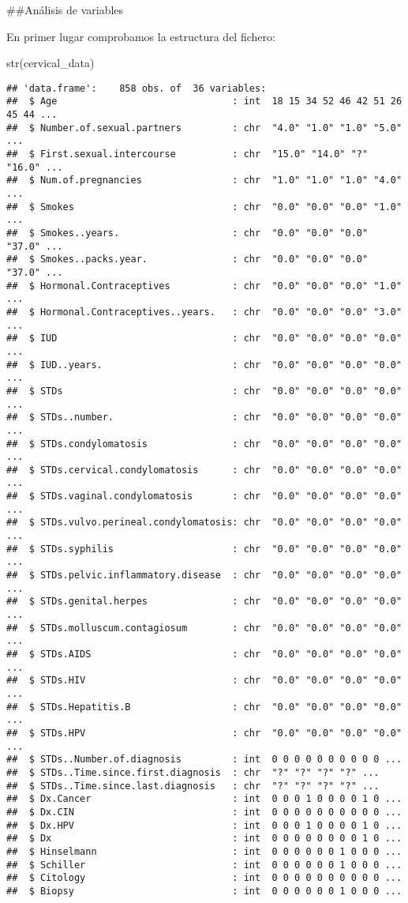 \documentclass[
]{article}
\newenvironment{Shaded}{\begin{snugshade}}{\end{snugshade}}
\newcommand{\FunctionTok}[1]{\textcolor[rgb]{0.94,0.94,0.56}{#1}}
\newcommand{\NormalTok}[1]{\textcolor[rgb]{0.80,0.80,0.80}{#1}}
\begin{document}
\#\#Análisis de variables

En primer lugar comprobamos la estructura del fichero:

\begin{Shaded}
\begin{Highlighting}[]
\FunctionTok{str}\NormalTok{(cervical\_data)}
\end{Highlighting}
\end{Shaded}

\begin{verbatim}
## 'data.frame':    858 obs. of  36 variables:
##  $ Age                               : int  18 15 34 52 46 42 51 26 45 44 ...
##  $ Number.of.sexual.partners         : chr  "4.0" "1.0" "1.0" "5.0" ...
##  $ First.sexual.intercourse          : chr  "15.0" "14.0" "?" "16.0" ...
##  $ Num.of.pregnancies                : chr  "1.0" "1.0" "1.0" "4.0" ...
##  $ Smokes                            : chr  "0.0" "0.0" "0.0" "1.0" ...
##  $ Smokes..years.                    : chr  "0.0" "0.0" "0.0" "37.0" ...
##  $ Smokes..packs.year.               : chr  "0.0" "0.0" "0.0" "37.0" ...
##  $ Hormonal.Contraceptives           : chr  "0.0" "0.0" "0.0" "1.0" ...
##  $ Hormonal.Contraceptives..years.   : chr  "0.0" "0.0" "0.0" "3.0" ...
##  $ IUD                               : chr  "0.0" "0.0" "0.0" "0.0" ...
##  $ IUD..years.                       : chr  "0.0" "0.0" "0.0" "0.0" ...
##  $ STDs                              : chr  "0.0" "0.0" "0.0" "0.0" ...
##  $ STDs..number.                     : chr  "0.0" "0.0" "0.0" "0.0" ...
##  $ STDs.condylomatosis               : chr  "0.0" "0.0" "0.0" "0.0" ...
##  $ STDs.cervical.condylomatosis      : chr  "0.0" "0.0" "0.0" "0.0" ...
##  $ STDs.vaginal.condylomatosis       : chr  "0.0" "0.0" "0.0" "0.0" ...
##  $ STDs.vulvo.perineal.condylomatosis: chr  "0.0" "0.0" "0.0" "0.0" ...
##  $ STDs.syphilis                     : chr  "0.0" "0.0" "0.0" "0.0" ...
##  $ STDs.pelvic.inflammatory.disease  : chr  "0.0" "0.0" "0.0" "0.0" ...
##  $ STDs.genital.herpes               : chr  "0.0" "0.0" "0.0" "0.0" ...
##  $ STDs.molluscum.contagiosum        : chr  "0.0" "0.0" "0.0" "0.0" ...
##  $ STDs.AIDS                         : chr  "0.0" "0.0" "0.0" "0.0" ...
##  $ STDs.HIV                          : chr  "0.0" "0.0" "0.0" "0.0" ...
##  $ STDs.Hepatitis.B                  : chr  "0.0" "0.0" "0.0" "0.0" ...
##  $ STDs.HPV                          : chr  "0.0" "0.0" "0.0" "0.0" ...
##  $ STDs..Number.of.diagnosis         : int  0 0 0 0 0 0 0 0 0 0 ...
##  $ STDs..Time.since.first.diagnosis  : chr  "?" "?" "?" "?" ...
##  $ STDs..Time.since.last.diagnosis   : chr  "?" "?" "?" "?" ...
##  $ Dx.Cancer                         : int  0 0 0 1 0 0 0 0 1 0 ...
##  $ Dx.CIN                            : int  0 0 0 0 0 0 0 0 0 0 ...
##  $ Dx.HPV                            : int  0 0 0 1 0 0 0 0 1 0 ...
##  $ Dx                                : int  0 0 0 0 0 0 0 0 1 0 ...
##  $ Hinselmann                        : int  0 0 0 0 0 0 1 0 0 0 ...
##  $ Schiller                          : int  0 0 0 0 0 0 1 0 0 0 ...
##  $ Citology                          : int  0 0 0 0 0 0 0 0 0 0 ...
##  $ Biopsy                            : int  0 0 0 0 0 0 1 0 0 0 ...
\end{verbatim}
\end{document}
